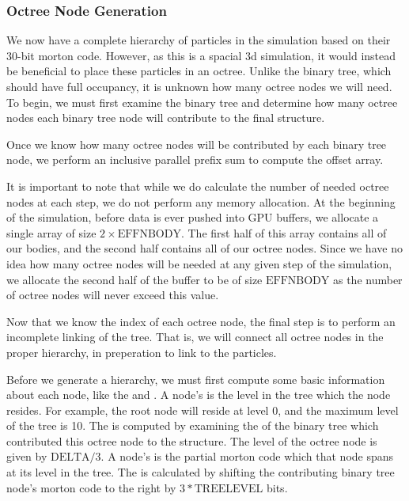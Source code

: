 \documentclass{thesis}
\begin{document}
\subsubsection{Octree Node Generation}
We now have a complete hierarchy of particles in the simulation based on their 30-bit morton code. However, as this is a spacial 3d simulation, it would instead be beneficial to place these particles in an octree. Unlike the binary tree, which should have full occupancy, it is unknown how many octree nodes we will need. To begin, we must first examine the binary tree and determine how many octree nodes each binary tree node will contribute to the final structure.

Once we know how many octree nodes will be contributed by each binary tree node, we perform an inclusive parallel prefix sum to compute the offset array. 

It is important to note that while we do calculate the number of needed octree nodes at each step, we do not perform any memory allocation. At the beginning of the simulation, before data is ever pushed into GPU buffers, we allocate a single array of size $2\times \text{EFFNBODY}$. The first half of this array contains all of our bodies, and the second half contains all of our octree nodes. Since we have no idea how many octree nodes will be needed at any given step of the simulation, we allocate the second half of the buffer to be of size $\text{EFFNBODY}$ as the number of octree nodes will never exceed this value. 

Now that we know the index of each octree node, the final step is to perform an incomplete linking of the tree. That is, we will connect all octree nodes in the proper hierarchy, in preperation to link to the particles.

Before we generate a hierarchy, we must first compute some basic information about each node, like the  and . A node's  is the level in the tree which the node resides. For example, the root node will reside at level 0, and the maximum level of the tree is 10. The  is computed by examining the  of the binary tree which contributed this octree node to the structure. The level of the octree node is given by $\text{DELTA}/3$. A node's  is the partial morton code which that node spans at its level in the tree. The  is calculated by shifting the contributing binary tree node's morton code to the right by $3 * \text{TREELEVEL}$ bits.  
\end{document}
